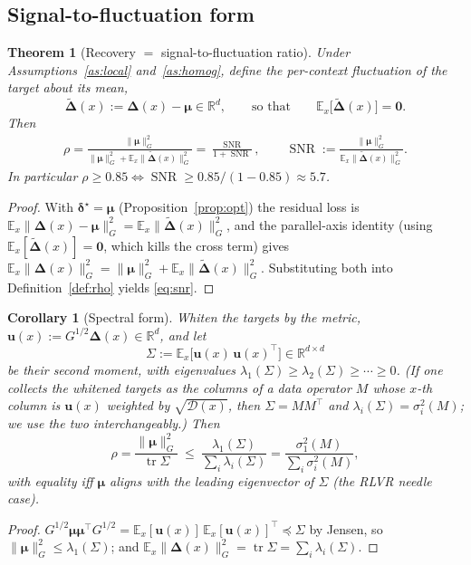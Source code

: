 \documentclass[11pt]{article}
\newtheorem{theorem}{Theorem}[section]
\newtheorem{corollary}{Corollary}[section]
\DeclareMathOperator{\SNR}{SNR}
\DeclareMathOperator{\tr}{tr}
\newcommand{\R}{\mathbb{R}}
\newcommand{\E}{\mathbb{E}}
\newcommand{\bu}{\mathbf{u}}
\newcommand{\bdelta}{\bm{\delta}}
\newcommand{\bDelta}{\bm{\Delta}}
\newcommand{\bmu}{\bm{\mu}}
\newcommand{\Gnorm}[1]{\lVert #1\rVert_G}
\begin{document}
\subsection{Signal-to-fluctuation form}\label{sub:snr}
\begin{theorem}[Recovery $=$ signal-to-fluctuation ratio]\label{thm:snr}
Under Assumptions~\ref{as:local} and~\ref{as:homog}, define the per-context fluctuation of the
target about its mean,
\begin{equation*}
\tilde{\bDelta}(x):=\bDelta(x)-\bmu\in\R^d,
\qquad\text{so that}\qquad \E_x\big[\tilde{\bDelta}(x)\big]=\mathbf 0 .
\end{equation*}
Then
\begin{equation}\label{eq:snr}
\boxed{\
\begin{gathered}
\rho=\frac{\Gnorm{\bmu}^2}{\Gnorm{\bmu}^2+\E_x\Gnorm{\tilde{\bDelta}(x)}^2}
=\frac{\SNR}{1+\SNR},\qquad
\SNR:=\frac{\Gnorm{\bmu}^2}{\E_x\Gnorm{\tilde{\bDelta}(x)}^2}.
\end{gathered}
\ }
\end{equation}
In particular $\rho\ge0.85\iff\SNR\ge0.85/(1-0.85)\approx5.7$.
\end{theorem}
\begin{proof}
With $\bdelta^\star=\bmu$ (Proposition~\ref{prop:opt}) the residual loss is
$\E_x\Gnorm{\bDelta(x)-\bmu}^2=\E_x\Gnorm{\tilde{\bDelta}(x)}^2$, and the parallel-axis identity
(using $\E_x[\tilde{\bDelta}(x)]=\mathbf 0$, which kills the cross term) gives
$\E_x\Gnorm{\bDelta(x)}^2=\Gnorm{\bmu}^2+\E_x\Gnorm{\tilde{\bDelta}(x)}^2$. Substituting both into
Definition~\ref{def:rho} yields \eqref{eq:snr}.
\end{proof}

\begin{corollary}[Spectral form]\label{cor:spectral}
Whiten the targets by the metric, $\bu(x):=G^{1/2}\bDelta(x)\in\R^d$, and let
\begin{equation*}
\Sigma:=\E_x\big[\bu(x)\,\bu(x)^\top\big]\in\R^{d\times d}
\end{equation*}
be their second moment, with eigenvalues $\lambda_1(\Sigma)\ge\lambda_2(\Sigma)\ge\cdots\ge0$. (If
one collects the whitened targets as the columns of a data operator $M$ whose $x$-th column is
$\bu(x)$ weighted by $\sqrt{\mathcal D(x)}$, then $\Sigma=MM^\top$ and
$\lambda_i(\Sigma)=\sigma_i^2(M)$; we use the two interchangeably.) Then
\begin{equation*}
\rho=\frac{\Gnorm{\bmu}^2}{\tr\Sigma}\ \le\ \frac{\lambda_1(\Sigma)}{\sum_i\lambda_i(\Sigma)}
=\frac{\sigma_1^2(M)}{\sum_i\sigma_i^2(M)},
\end{equation*}
with equality iff $\bmu$ aligns with the leading eigenvector of $\Sigma$ (the RLVR needle case).
\end{corollary}
\begin{proof}
$G^{1/2}\bmu\bmu^\top G^{1/2}=\E_x[\bu(x)]\,\E_x[\bu(x)]^\top\preceq\Sigma$ by Jensen, so
$\Gnorm{\bmu}^2\le\lambda_1(\Sigma)$; and $\E_x\Gnorm{\bDelta(x)}^2=\tr\Sigma=\sum_i\lambda_i(\Sigma)$.
\end{proof}
\end{document}

